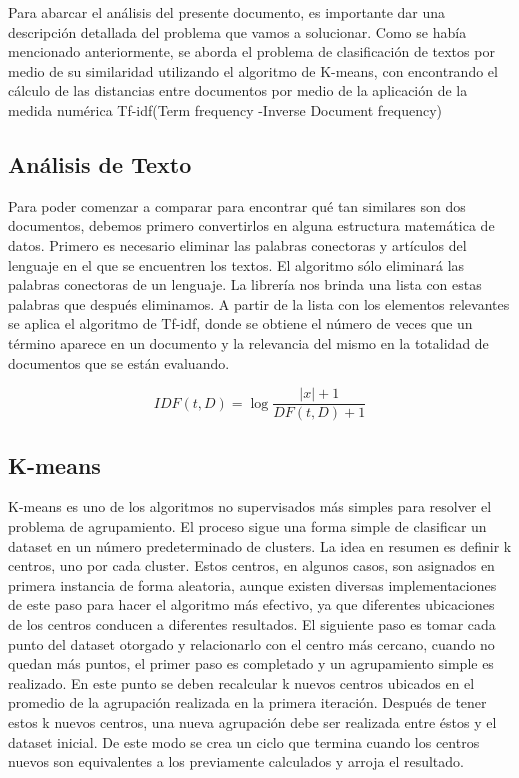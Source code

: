\documentclass[fleqn,10pt]{SelfArx} %
\begin{document}
Para abarcar el análisis del presente documento, es importante  dar una descripción detallada del problema que vamos a solucionar. Como se había mencionado anteriormente, se aborda el problema de clasificación de textos por medio de su similaridad utilizando el algoritmo de K-means, con encontrando el cálculo de las distancias entre documentos por medio de la aplicación de la medida numérica Tf-idf(Term frequency -Inverse Document frequency)

\subsection{Análisis de Texto}

Para poder comenzar a comparar para encontrar qué tan similares son dos documentos, debemos primero convertirlos en alguna estructura matemática de datos. 
Primero es necesario eliminar las palabras conectoras y artículos del lenguaje en el que se encuentren los textos. El algoritmo sólo eliminará las palabras conectoras de un lenguaje. La librería nos brinda una lista con estas palabras que después eliminamos.
A partir de la lista con los elementos relevantes se aplica el algoritmo de Tf-idf, donde se obtiene el número de veces que un término aparece en un documento y la relevancia del mismo en la totalidad de documentos que se están evaluando.

\begin{equation}
IDF(t,D)=\log \frac{|x| + 1}{DF(t,D)+1}
\label{eq:refname2}
\end{equation}

\subsection{K-means}
K-means es uno de los algoritmos no supervisados más simples para resolver el problema de agrupamiento. El proceso sigue una forma simple de clasificar un dataset en un número predeterminado de clusters. La idea en resumen es definir k centros, uno por cada cluster. Estos centros, en algunos casos, son asignados en primera instancia de forma aleatoria, aunque existen diversas implementaciones de este paso para hacer el algoritmo más efectivo, ya que diferentes ubicaciones de los centros conducen a diferentes resultados.
El siguiente paso es tomar cada punto del dataset otorgado y relacionarlo con el centro más cercano, cuando no quedan más puntos, el primer paso es completado y un agrupamiento simple es realizado.
En este punto se deben recalcular k nuevos centros ubicados en el promedio de la agrupación realizada en la primera iteración. Después de tener estos k nuevos centros, una nueva agrupación debe ser realizada entre éstos y el dataset inicial.
De este modo se crea un ciclo que termina cuando los centros nuevos son equivalentes a los previamente calculados y arroja el resultado.
\end{document}
